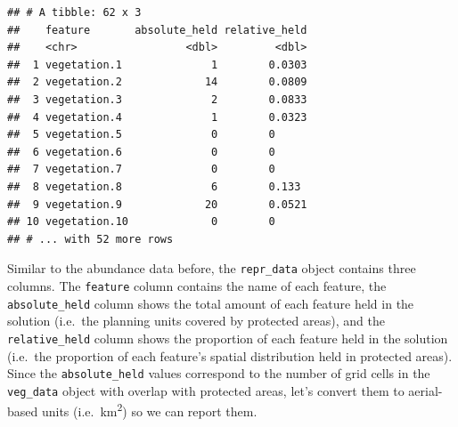 \documentclass[12pt,]{book}
\newenvironment{Shaded}{\begin{snugshade}}{\end{snugshade}}
\newcommand{\KeywordTok}[1]{\textcolor[rgb]{0.13,0.29,0.53}{\textbf{#1}}}
\newcommand{\StringTok}[1]{\textcolor[rgb]{0.31,0.60,0.02}{#1}}
\newcommand{\CommentTok}[1]{\textcolor[rgb]{0.56,0.35,0.01}{\textit{#1}}}
\newcommand{\OperatorTok}[1]{\textcolor[rgb]{0.81,0.36,0.00}{\textbf{#1}}}
\newcommand{\NormalTok}[1]{#1}
\begin{document}
\begin{Shaded}
\end{Shaded}

\begin{verbatim}
## # A tibble: 62 x 3
##    feature       absolute_held relative_held
##    <chr>                 <dbl>         <dbl>
##  1 vegetation.1              1        0.0303
##  2 vegetation.2             14        0.0809
##  3 vegetation.3              2        0.0833
##  4 vegetation.4              1        0.0323
##  5 vegetation.5              0        0     
##  6 vegetation.6              0        0     
##  7 vegetation.7              0        0     
##  8 vegetation.8              6        0.133 
##  9 vegetation.9             20        0.0521
## 10 vegetation.10             0        0     
## # ... with 52 more rows
\end{verbatim}

Similar to the abundance data before, the \texttt{repr\_data} object
contains three columns. The \texttt{feature} column contains the name of
each feature, the \texttt{absolute\_held} column shows the total amount
of each feature held in the solution (i.e.~the planning units covered by
protected areas), and the \texttt{relative\_held} column shows the
proportion of each feature held in the solution (i.e.~the proportion of
each feature's spatial distribution held in protected areas). Since the
\texttt{absolute\_held} values correspond to the number of grid cells in
the \texttt{veg\_data} object with overlap with protected areas, let's
convert them to aerial-based units (i.e.~km\textsuperscript{2}) so we
can report them.
\end{document}
